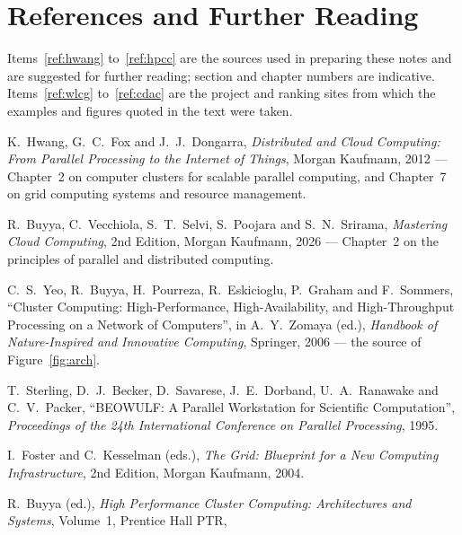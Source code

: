 \section{References and Further Reading}

Items~\ref{ref:hwang} to~\ref{ref:hpcc} are the sources used in preparing
these notes and are suggested for further reading; section and chapter
numbers are indicative. Items~\ref{ref:wlcg} to~\ref{ref:cdac} are the
project and ranking sites from which the examples and figures quoted in the
text were taken.

\begin{enumerate}[label={[\arabic*]},ref=\arabic*,leftmargin=2.2em]
  \item\label{ref:hwang} K.~Hwang, G.~C.~Fox and J.~J.~Dongarra,
        \textit{Distributed and Cloud Computing: From Parallel Processing to
        the Internet of Things}, Morgan Kaufmann, 2012 --- Chapter~2 on
        computer clusters for scalable parallel computing, and Chapter~7 on
        grid computing systems and resource management.
  \item\label{ref:buyya} R.~Buyya, C.~Vecchiola, S.~T.~Selvi, S.~Poojara and
        S.~N.~Srirama, \textit{Mastering Cloud Computing}, 2nd Edition,
        Morgan Kaufmann, 2026 --- Chapter~2 on the principles of parallel and
        distributed computing.
  \item\label{ref:yeo} C.~S.~Yeo, R.~Buyya, H.~Pourreza, R.~Eskicioglu,
        P.~Graham and F.~Sommers, ``Cluster Computing: High-Performance,
        High-Availability, and High-Throughput Processing on a Network of
        Computers'', in A.~Y.~Zomaya (ed.), \textit{Handbook of
        Nature-Inspired and Innovative Computing}, Springer, 2006 --- the
        source of Figure~\ref{fig:arch}.
  \item\label{ref:beowulf} T.~Sterling, D.~J.~Becker, D.~Savarese,
        J.~E.~Dorband, U.~A.~Ranawake and C.~V.~Packer, ``BEOWULF: A Parallel
        Workstation for Scientific Computation'', \textit{Proceedings of the
        24th International Conference on Parallel Processing}, 1995.
  \item\label{ref:blueprint} I.~Foster and C.~Kesselman (eds.), \textit{The
        Grid: Blueprint for a New Computing Infrastructure}, 2nd Edition,
        Morgan Kaufmann, 2004.
  \item\label{ref:hpcc} R.~Buyya (ed.), \textit{High Performance Cluster
        Computing: Architectures and Systems}, Volume~1, Prentice Hall PTR,

\end{enumerate}
